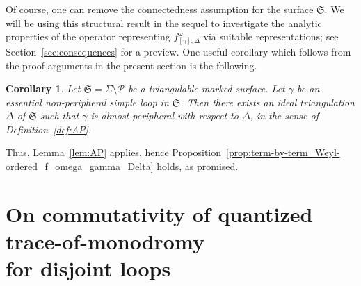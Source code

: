 \documentclass[10pt,a4paper]{amsart}
\numberwithin{equation}{section}
\newtheorem{Corollary}[Theorem]{Corollary}
\theoremstyle{definition}
\begin{document}
Of course, one can remove the connectedness assumption for the surface $\mathfrak{S}$. We will be using this structural result in the sequel \cite{sequel} to investigate the analytic properties of the operator representing $f^\omega_{[\gamma],\Delta}$ via suitable representations; see Section~\ref{sec:consequences} for a preview.
One useful corollary which follows from the proof arguments in the present section is the following.
\begin{Corollary}\label{cor:AP}
Let $\mathfrak{S}= \Sigma\setminus\mathcal{P}$ be a triangulable marked surface. Let $\gamma$ be an essential non-peripheral simple loop in $\mathfrak{S}$. Then there exists an ideal triangulation $\Delta$ of $\mathfrak{S}$ such that $\gamma$ is almost-peripheral with respect to $\Delta$, in the sense of Definition~{\rm \ref{def:AP}}.
\end{Corollary}
Thus, Lemma~\ref{lem:AP} applies, hence Proposition~\ref{prop:term-by-term_Weyl-ordered_f_omega_gamma_Delta} holds, as promised.
\section[On commutativity of quantized trace-of-monodromy for disjoint loops]{On commutativity of quantized trace-of-monodromy \\ for disjoint loops}
\label{sec:on_commutativity}
\end{document}
